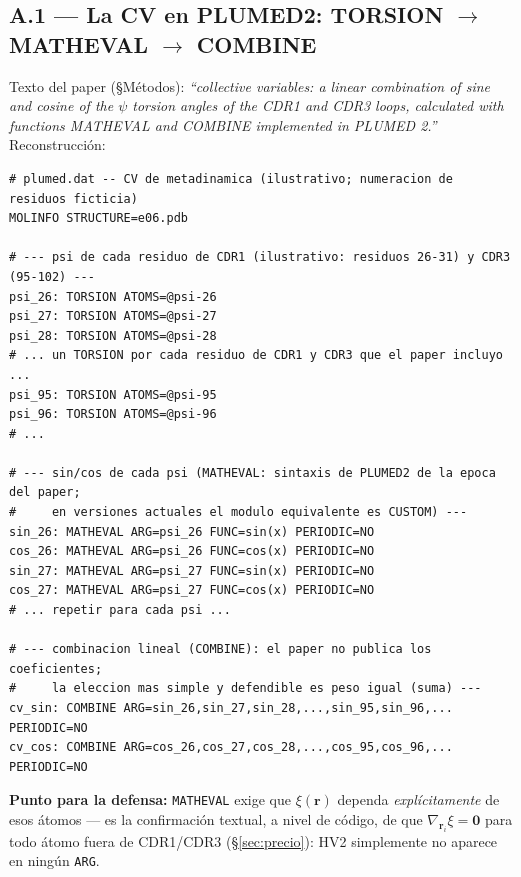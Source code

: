 \documentclass[11pt]{article}
\begin{document}
\subsection*{A.1 --- La CV en PLUMED2: TORSION $\to$ MATHEVAL $\to$ COMBINE}
Texto del paper (\S Métodos): \textit{``collective variables: a linear combination of sine and cosine of the $\psi$ torsion angles of the CDR1 and CDR3 loops, calculated with functions MATHEVAL and COMBINE implemented in PLUMED 2.''} Reconstrucción:

{\footnotesize\begin{verbatim}
# plumed.dat -- CV de metadinamica (ilustrativo; numeracion de residuos ficticia)
MOLINFO STRUCTURE=e06.pdb

# --- psi de cada residuo de CDR1 (ilustrativo: residuos 26-31) y CDR3 (95-102) ---
psi_26: TORSION ATOMS=@psi-26
psi_27: TORSION ATOMS=@psi-27
psi_28: TORSION ATOMS=@psi-28
# ... un TORSION por cada residuo de CDR1 y CDR3 que el paper incluyo ...
psi_95: TORSION ATOMS=@psi-95
psi_96: TORSION ATOMS=@psi-96
# ...

# --- sin/cos de cada psi (MATHEVAL: sintaxis de PLUMED2 de la epoca del paper;
#     en versiones actuales el modulo equivalente es CUSTOM) ---
sin_26: MATHEVAL ARG=psi_26 FUNC=sin(x) PERIODIC=NO
cos_26: MATHEVAL ARG=psi_26 FUNC=cos(x) PERIODIC=NO
sin_27: MATHEVAL ARG=psi_27 FUNC=sin(x) PERIODIC=NO
cos_27: MATHEVAL ARG=psi_27 FUNC=cos(x) PERIODIC=NO
# ... repetir para cada psi ...

# --- combinacion lineal (COMBINE): el paper no publica los coeficientes;
#     la eleccion mas simple y defendible es peso igual (suma) ---
cv_sin: COMBINE ARG=sin_26,sin_27,sin_28,...,sin_95,sin_96,... PERIODIC=NO
cv_cos: COMBINE ARG=cos_26,cos_27,cos_28,...,cos_95,cos_96,... PERIODIC=NO
\end{verbatim}}

\textbf{Punto para la defensa:} \texttt{MATHEVAL} exige que $\xi(\mathbf{r})$ dependa \emph{explícitamente} de esos átomos --- es la confirmación textual, a nivel de código, de que $\nabla_{\mathbf{r}_i}\xi=\mathbf{0}$ para todo átomo fuera de CDR1/CDR3 (\S\ref{sec:precio}): HV2 simplemente no aparece en ningún \texttt{ARG}.
\end{document}
